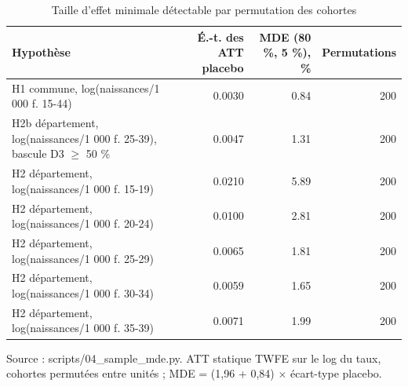 \begin{table}[htbp]\centering
\begin{threeparttable}
\caption{Taille d'effet minimale détectable par permutation des cohortes}\label{tab:mde}
\footnotesize
\begin{tabular}{p{6.8cm}rrr}
\toprule
Hypothèse & É.-t. des ATT placebo & MDE (80 \%, 5 \%), \% & Permutations \\
\midrule
H1 commune, log(naissances/1 000 f. 15-44) & 0.0030 & 0.84 & 200 \\
H2b département, log(naissances/1 000 f. 25-39), bascule D3 $\geq$ 50 \% & 0.0047 & 1.31 & 200 \\
H2 département, log(naissances/1 000 f. 15-19) & 0.0210 & 5.89 & 200 \\
H2 département, log(naissances/1 000 f. 20-24) & 0.0100 & 2.81 & 200 \\
H2 département, log(naissances/1 000 f. 25-29) & 0.0065 & 1.81 & 200 \\
H2 département, log(naissances/1 000 f. 30-34) & 0.0059 & 1.65 & 200 \\
H2 département, log(naissances/1 000 f. 35-39) & 0.0071 & 1.99 & 200 \\
\bottomrule
\end{tabular}
\begin{tablenotes}\footnotesize
\item Source : scripts/04\_sample\_mde.py. ATT statique TWFE sur le log du taux, cohortes permutées entre unités ; MDE = (1,96 + 0,84) $\times$ écart-type placebo.
\end{tablenotes}
\end{threeparttable}
\end{table}
